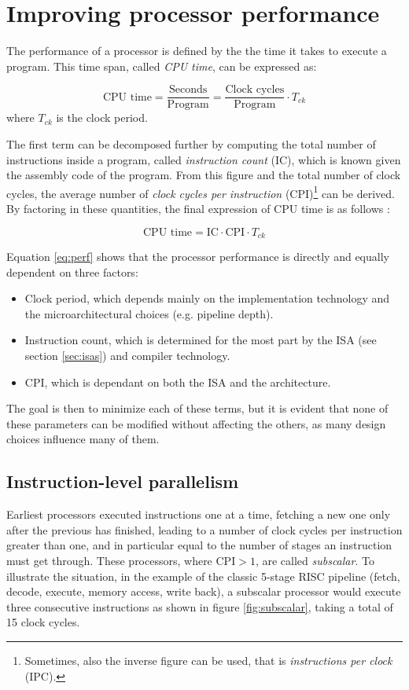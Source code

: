 \chapter{Improving processor performance}
The performance of a processor is defined by the the time it takes to execute a program. This time span, called \emph{CPU time}, can be expressed as:

\begin{equation*}
  \text{CPU time} = \frac{\text{Seconds}}{\text{Program}} = \frac{\text{Clock cycles}}{\text{Program}} \cdot T_{ck}
\end{equation*}
where $T_{ck}$ is the clock period.

The first term can be decomposed further by computing the total number of instructions inside a program, called \emph{instruction count} (IC), which is known given the assembly code of the program. From this figure and the total number of clock cycles, the average number of \emph{clock cycles per instruction} (CPI)\footnote{Sometimes, also the inverse figure can be used, that is \emph{instructions per clock} (IPC).} can be derived. By factoring in these quantities, the final expression of CPU time is as follows \cite[p.~53]{hennessy17}:

\begin{equation}\label{eq:perf}
  \text{CPU time} = \text{IC} \cdot \text{CPI} \cdot T_{ck} 
\end{equation}

Equation \eqref{eq:perf} shows that the processor performance is directly and equally dependent on three factors:
\begin{itemize}
  \item Clock period, which depends mainly on the implementation technology and the microarchitectural choices (e.g. pipeline depth).
  \item Instruction count, which is determined for the most part by the ISA (see section \ref{sec:isas}) and compiler technology.
  \item CPI, which is dependant on both the ISA and the architecture.
\end{itemize}
The goal is then to minimize each of these terms, but it is evident that none of these parameters can be modified without affecting the others, as many design choices influence many of them.

\section{Instruction-level parallelism}
Earliest processors executed instructions one at a time, fetching a new one only after the previous has finished, leading to a number of clock cycles per instruction greater than one, and in particular equal to the number of stages an instruction must get through. These processors, where $\text{CPI} > 1$, are called \emph{subscalar}. To illustrate the situation, in the example of the classic 5-stage RISC pipeline (fetch, decode, execute, memory access, write back), a subscalar processor would execute three consecutive instructions as shown in figure \ref{fig:subscalar}, taking a total of 15 clock cycles.

